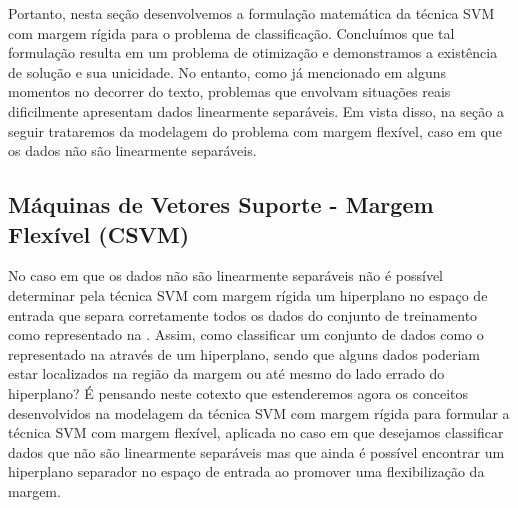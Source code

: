 \documentclass[12pt,a4paper]{scrartcl}
\theoremstyle{definition}%
\begin{document}
Portanto, nesta seção desenvolvemos a formulação matemática da técnica SVM com margem rígida para o problema de classificação. Concluímos que tal formulação resulta em um problema de otimização e demonstramos a existência de solução e sua unicidade. No entanto, como já mencionado em alguns momentos no decorrer do texto, problemas que envolvam situações reais dificilmente apresentam dados linearmente separáveis. Em vista disso, na seção a seguir trataremos da modelagem do problema com margem flexível, caso em que os dados não são linearmente separáveis.


\subsection{Máquinas de Vetores Suporte - Margem Flexível (CSVM)}  \label{subsection:SVM_margem_flexivel}

No caso em que os dados não são linearmente separáveis não é possível determinar pela técnica SVM com margem rígida um hiperplano no espaço de entrada que separa corretamente todos os dados do conjunto de treinamento como representado na . Assim, como classificar um conjunto de dados como o representado na  através de um hiperplano, sendo que alguns dados poderiam estar localizados na região da margem ou até mesmo do lado errado do hiperplano? É pensando neste cotexto que estenderemos agora os conceitos desenvolvidos na modelagem da técnica SVM com margem rígida para formular a técnica SVM com margem flexível, aplicada no caso em que desejamos classificar dados que não são linearmente separáveis mas que ainda é possível encontrar um hiperplano separador no espaço de entrada ao promover uma flexibilização da margem. 

\end{document}
